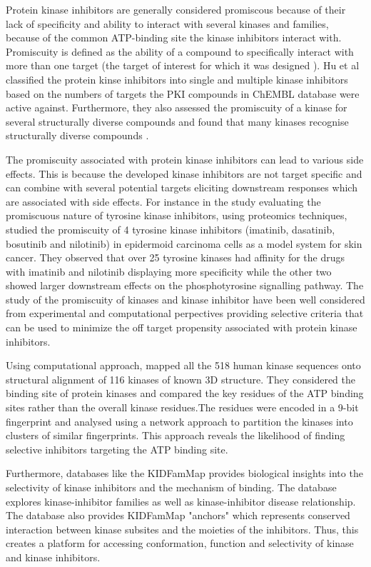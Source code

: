 \documentclass[a4paper, 11pt]{report}
\begin{document}
Protein kinase inhibitors are generally considered promiscous because of their lack of specificity and ability to interact with several kinases and families, because of the common ATP-binding site the kinase inhibitors interact with. Promiscuity is defined as the ability of a compound to specifically interact with more than one target (the target of interest for which it was designed \cite{hu2017mapping}). Hu et al classified the protein kinse inhibitors into single and multiple kinase inhibitors based on the numbers of targets the PKI compounds in ChEMBL database were active against. Furthermore, they also assessed the promiscuity of a kinase for several structurally diverse compounds and found that many kinases recognise structurally diverse compounds \cite{hu2017mapping}.\par
The promiscuity associated with protein kinase inhibitors can lead to various side effects. This is because the developed kinase inhibitors are not target specific and can combine with several potential targets eliciting downstream responses which are associated with side effects. For instance in the study evaluating the promiscuous nature of tyrosine kinase inhibitors, \cite{giansanti2014evaluating} using proteomics techniques, studied the promiscuity of 4 tyrosine kinase inhibitors (imatinib, dasatinib, bosutinib and nilotinib) in epidermoid carcinoma cells as a model system for skin cancer. They observed that over 25 tyrosine kinases had affinity for the drugs with imatinib and nilotinib displaying more specificity while the other two showed larger downstream effects on the phosphotyrosine signalling pathway. The study  of the promiscuity of kinases and kinase inhibitor have been well considered from experimental and computational perpectives providing selective criteria that can be used to minimize the off target propensity associated with protein kinase inhibitors.\par
Using computational approach, \cite{huang2009kinase} mapped all the 518 human kinase sequences onto structural alignment of 116 kinases of known 3D structure. They considered the binding site of protein kinases and compared the key residues of the ATP binding sites rather than the overall kinase residues.The residues were encoded in a 9-bit fingerprint and analysed using a network approach to partition the kinases into clusters of similar fingerprints. This approach reveals the likelihood of finding selective inhibitors targeting the ATP binding site.\par
Furthermore, databases like the KIDFamMap \cite{chiu2012kidfammap} provides biological insights into the selectivity of kinase inhibitors and the mechanism of binding. The database explores kinase-inhibitor families as well as kinase-inhibitor disease relationship. The database also provides KIDFamMap "anchors" which represents conserved interaction between kinase subsites and the moieties of the inhibitors. Thus, this creates a platform for accessing conformation, function and selectivity of kinase and kinase inhibitors. 
\end{document}
